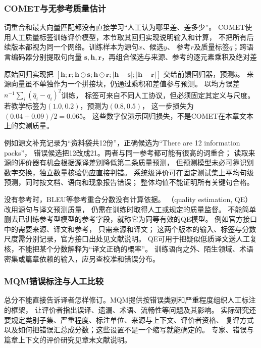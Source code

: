 \subsubsection{COMET与无参考质量估计}
\label{sec:nlp-generation-comet}

词重合和最大向量匹配都没有直接学习“人工认为哪里差、差多少”。
COMET使用人工质量标签训练评价模型，本节取其回归实现说明输入和计算，
不把所有后续版本都视为同一个网络。训练样本为源句$x$、候选$y$、
参考$r$及质量标签$q$；跨语言编码器分别提取句向量
$\bm s,\bm h,\bm r$，再组合候选与来源、参考的逐元素乘积及绝对差

原始回归实现把
$[\bm h;\bm r;\bm h\odot\bm s;\bm h\odot\bm r;
|\bm h-\bm s|;|\bm h-\bm r|]$
交给前馈回归器，预测$\widehat q$。
来源向量虽不单独作为一个拼接块，仍通过乘积和差值参与预测。
以均方误差$n^{-1}\sum_i(\widehat q_i-q_i)^2$训练，
标签可来自不同人工协议，但必须固定其定义与尺度。
若教学标签为$(1.0,0.2)$，预测为$(0.8,0.5)$，
这一步损失为$(0.04+0.09)/2=0.065$。
这些数字仅演示回归损失，不是COMET在本章文本上的实测质量。

例如源文补充记录为“资料袋共12份”，正确候选为“There are 12 information packs”，
错误候选把12改成21。两者与同一参考都可能有很高的词重合；
读取来源的评价器有机会根据源译差别降低第二条质量预测，
但预测模型未必可靠识别数字交换，独立数量核验仍应直接判错。
系统级评价可在固定测试集上平均句级预测，同时按文档、语向和现象报告错误；
整体均值不能证明所有关键句合格。

没有参考时，BLEU等参考重合分数没有计算依据。
（quality estimation, QE）改用源句与译文预测质量，
仍需在训练时取得人工或规定的质量监督。
不能简单删去已训练参考型模型的参考字段，就称它为同等有效的QE模型。
例如官方接口中的需要来源、译文和参考，
只需来源和译文；
这两个版本的输入、标签与分数尺度需分别记录，官方接口出处见文献说明。
QE可用于把疑似低质译文送人工复核，不能把某个分数解释为“译文正确的概率”。
训练语向之外、陌生领域、术语密集或篇章依赖的输入，应另查校准和错误分布。

\subsubsection{MQM错误标注与人工比较}
\label{sec:nlp-generation-mqm}

总分不能直接告诉译者怎样修订。MQM提供按错误类别和严重程度组织人工标注的框架，
让评价者指出误译、遗漏、术语、流畅性等问题及其影响。
实际研究还要规定类别子集、严重程度、标注单位、来源与上下文、评价者资格、
复评方式以及如何把错误汇总成分数；这些设置不是一个缩写就能确定的。
专家、错误与篇章上下文的评价研究见章末文献说明。

